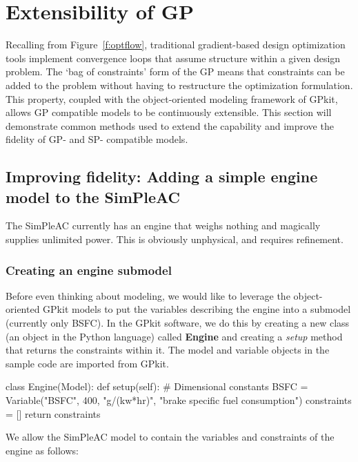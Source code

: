 \chapter{Extensibility of GP}
\label{ch3:extensibility}

Recalling from Figure~\ref{f:optflow}, traditional gradient-based design optimization tools implement
convergence loops that assume structure within a given design problem.
The `bag of constraints' form of the GP means that constraints can be
added to the problem without
having to restructure the optimization formulation. This property,
coupled with the object-oriented modeling framework of GPkit, allows
\gls{GP} compatible models to be continuously extensible.
This section will demonstrate common methods used to extend the capability
and improve the fidelity of \gls{GP}- and \gls{SP}- compatible models.

\section{Improving fidelity: Adding a simple engine model to the SimPleAC}
\label{s:engine}

The SimPleAC currently has an engine that weighs nothing and magically supplies
unlimited power. This is obviously unphysical, and requires refinement.

\subsection{Creating an engine submodel}

Before even thinking about modeling, we would like to leverage the object-oriented
GPkit models to put the variables describing the engine into a submodel (currently only
BSFC). In the GPkit software, we do this by creating a new class (an object in the Python language)
called \textbf{Engine} and creating a \textit{setup}
method that returns the constraints within it. The model and variable objects in the sample code
are imported from GPkit.

\begin{python}
    class Engine(Model):
        def setup(self):
            # Dimensional constants
            BSFC = Variable("BSFC", 400, "g/(kw*hr)",
                                    "brake specific fuel consumption")
            constraints = []
            return constraints
\end{python}

We allow the SimPleAC model to contain the variables and constraints of the engine
as follows:

